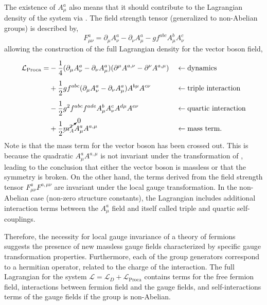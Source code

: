 The existence of $A_\mu^a$ also means that it should contribute to the Lagrangian density of the system via .
The field strength tensor (generalized to non-Abelian groups) is described by,
\begin{equation}
	\label{eq:field_strength_tensor}
	F_{\mu\nu}^a = \partial_\mu A_\nu^a - \partial_\nu A_\mu^a - g f^{abc} A_\mu^b A_\nu^c
\end{equation}
allowing the construction of the full Lagrangian density for the vector boson field,
\begin{align}
	\label{eq:boson}
	\mathcal{L}_\text{Proca} =
	 & \vphantom{\cancelto{0}{m_A^2}} -\frac{1}{4}(\partial_\mu A_\nu^a - \partial_\nu A_\mu^a) (\partial^\mu A^{a,\nu} - \partial^\nu A^{a,\mu}) &  & \leftarrow \text{dynamics}            \\
	 & \vphantom{\cancelto{0}{m_A^2}} + \frac{1}{2} g f^{abc} (\partial_\mu A_\nu^a - \partial_\nu A_\mu^a) A^{b\mu} A^{c\nu}                     &  & \leftarrow \text{triple interaction}  \\
	 & \vphantom{\cancelto{0}{m_A^2}} - \frac{1}{2} g^2 f^{abc} f^{ade} A_\mu^b A_\nu^c A^{d\mu} A^{e\nu}                                         &  & \leftarrow \text{quartic interaction} \\
	 & + \frac{1}{2} \cancelto{0}{m_A^2} A_\mu^a A^{a,\mu}                                                                                        &  & \leftarrow \text{mass term}.
\end{align}
Note is that the mass term for the vector boson has been crossed out.
This is because the quadratic $A_\mu^a A^{a,\mu}$ is not invariant under the transformation of , leading to the conclusion that either the vector boson is massless or that the symmetry is broken.
On the other hand, the terms derived from the field strength tensor $F_{\mu\nu}^a F^{a,\mu\nu}$ are invariant under the local gauge transformation.
In the non-Abelian case (non-zero structure constants), the Lagrangian includes additional interaction terms between the $A_\mu^a$ field and itself called triple and quartic self-couplings.

Therefore, the necessity for local gauge invariance of a theory of fermions suggests the presence of new massless gauge fields characterized by specific gauge transformation properties.
Furthermore, each of the group generators correspond to a hermitian operator, related to the charge of the interaction.
The full Lagrangian for the system $\mathcal{L} = \mathcal{L}_D + \mathcal{L}_\text{Proca}$ contains terms for the free fermion field, interactions between fermion field and the gauge fields, and self-interactions terms of the gauge fields if the group is non-Abelian.

